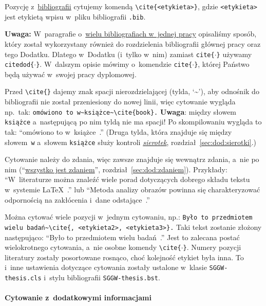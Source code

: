 Pozycję z~\hyperref[sec:dod:bibliografia]{bibliografii} cytujemy komendą \verb+\cite{<etykieta>}+, gdzie {\tt <etykieta>} jest etykietą wpisu w~pliku bibliografii {\tt *.bib}. 

{\bf Uwaga:} W~paragrafie o~\hyperref[sec:dod:bibliografia-wiele]{wielu bibliografiach w~jednej pracy} opisaliśmy sposób, który został wykorzystany również do rozdzielenia bibliografii głównej pracy oraz tego Dodatku. Dlatego w~Dodatku (i~tylko w~nim) zamiast {\tt \tbs{}cite\{$\cdot$\}} używamy {\tt \tbs{}citedod\{$\cdot$\}}. W~dalszym opisie mówimy o~komendzie {\tt \tbs{}cite\{$\cdot$\}}, której Państwo będą używać w~swojej pracy dyplomowej.

Przed \verb+\cite{}+ dajemy znak spacji nierozdzielającej (tylda, `\~{}'), aby odnośnik do bibliografii nie został przeniesiony do nowej linii, więc cytowanie wygląda np.\ tak: {\tt omówiono to w\~{}książce\~{}\textbackslash{}cite\{book\}.} {\bf Uwaga}: między słowem {\tt książce} a~następującą po nim tyldą nie ma spacji! Po skompilowaniu wygląda to tak: ``omówiono to w~książce~.'' (Druga tylda, która znajduje się między słowem~{\tt w} a~słowem {\tt książce} służy kontroli \hyperref[sec:dod:sierotki]{\em sierotek}, rozdział~\ref{sec:dod:sierotki}.)

Cytowanie należy do zdania, więc zawsze znajduje się wewnątrz zdania, a~nie po nim (``\hyperref[sec:dod:zdaniem]{wszystko jest zdaniem}'', rozdział~\ref{sec:dod:zdaniem}). Przykłady: ``W~literaturze można znaleźć wiele porad dotyczących dobrego składu tekstu w~systemie \LaTeX~.'' lub ``Metoda analizy obrazów powinna się charakteryzować odpornością na zakłócenia i~dane odstające~.''

Można cytować wiele pozycji w~jednym cytowaniu, np.: {\tt Było to przedmiotem wielu badań\~{}\textbackslash{}cite\{<etykieta1>, <etykieta2>, <etykieta3>\}.} Taki tekst zostanie złożony następująco: ``Było to przedmiotem wielu badań~.'' Jest to zalecana postać wielokrotnego cytowania, a~nie osobne komendy {\tt \textbackslash{}cite\{$\cdot$\}}. Numery pozycji literatury zostały posortowane rosnąco, choć kolejność etykiet była inna. To i~inne ustawienia dotyczące cytowania zostały ustalone w~klasie {\tt SGGW-thesis.cls} i~stylu bibliografii {\tt SGGW-thesis.bst}.


\paragraph{Cytowanie z~dodatkowymi informacjami}
\label{sec:dod:cytowanie-dodatkowe-informacje}

